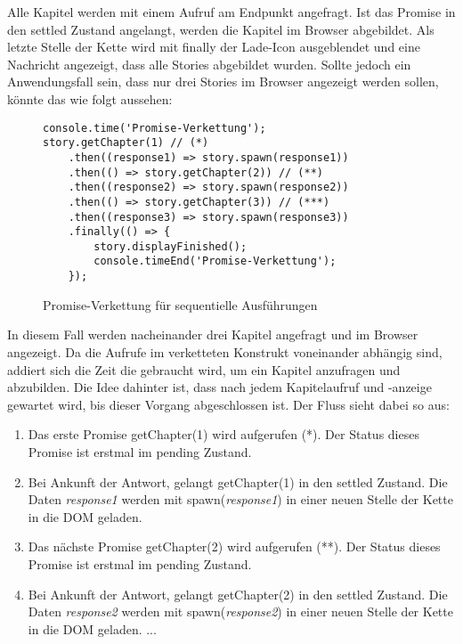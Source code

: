 \noindent
Alle Kapitel werden mit einem Aufruf am Endpunkt angefragt. Ist das Promise in den settled Zustand angelangt, werden die Kapitel im Browser abgebildet. Als letzte Stelle der Kette wird mit finally der Lade-Icon ausgeblendet und eine Nachricht angezeigt, dass alle Stories abgebildet wurden. Sollte jedoch ein Anwendungsfall sein, dass nur drei Stories im Browser angezeigt werden sollen, könnte das wie folgt aussehen: 

\begin{figure}[H]
\begin{lstlisting}[basicstyle=\small]
console.time('Promise-Verkettung');
story.getChapter(1) // (*)
    .then((response1) => story.spawn(response1))
    .then(() => story.getChapter(2)) // (**)
    .then((response2) => story.spawn(response2))
    .then(() => story.getChapter(3)) // (***)
    .then((response3) => story.spawn(response3))
    .finally(() => {
        story.displayFinished();
        console.timeEnd('Promise-Verkettung');
    });
\end{lstlisting}
\caption{Promise-Verkettung für sequentielle Ausführungen}
\label{Promises-sequential-calls}
\end{figure}

\noindent
In diesem Fall werden nacheinander drei Kapitel angefragt und im Browser angezeigt. Da die Aufrufe im verketteten Konstrukt voneinander abhängig sind, addiert sich die Zeit die gebraucht wird, um ein Kapitel anzufragen und abzubilden. Die Idee dahinter ist, dass nach jedem Kapitelaufruf und -anzeige gewartet wird, bis dieser Vorgang abgeschlossen ist. Der Fluss sieht dabei so aus:

\begin{enumerate}
    \item Das erste Promise getChapter(1) wird aufgerufen (*). Der Status dieses Promise ist erstmal im pending Zustand.
    \item Bei Ankunft der Antwort, gelangt getChapter(1) in den settled Zustand. Die Daten \textit{response1} werden mit spawn(\textit{response1}) in einer neuen Stelle der Kette in die DOM geladen.
    \item Das nächste Promise getChapter(2) wird aufgerufen (**). Der Status dieses Promise ist erstmal im pending Zustand. 
    \item Bei Ankunft der Antwort, gelangt getChapter(2) in den settled Zustand. Die Daten \textit{response2} werden mit spawn(\textit{response2}) in einer neuen Stelle der Kette in die DOM geladen.
    ...
\end{enumerate}

